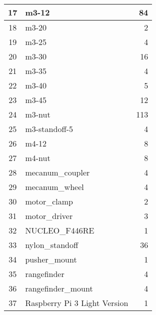 \begin{longtable}{clr}
	17       & m3-12                                   & 84                       \\ \hline
	18       & m3-20                                   & 2                        \\ \hline
	19       & m3-25                                   & 4                        \\ \hline
	20       & m3-30                                   & 16                       \\ \hline
	21       & m3-35                                   & 4                        \\ \hline
	22       & m3-40                                   & 5                        \\ \hline
	23       & m3-45                                   & 12                       \\ \hline
	24       & m3-nut                                  & 113                      \\ \hline
	25       & m3-standoff-5                           & 4                        \\ \hline
	26       & m4-12                                   & 8                        \\ \hline
	27       & m4-nut                                  & 8                        \\ \hline
	28       & mecanum\_coupler                        & 4                        \\ \hline
	29       & mecanum\_wheel                          & 4                        \\ \hline
	30       & motor\_clamp                            & 2                        \\ \hline
	31       & motor\_driver                           & 3                        \\ \hline
	32       & NUCLEO\_F446RE                          & 1                        \\ \hline
	33       & nylon\_standoff                         & 36                       \\ \hline
	34       & pusher\_mount                           & 1                        \\ \hline
	35       & rangefinder                             & 4                        \\ \hline
	36       & rangefinder\_mount                      & 4                        \\ \hline
	37       & Raspberry Pi 3 Light Version            & 1                        \\ \hline

\end{longtable}
